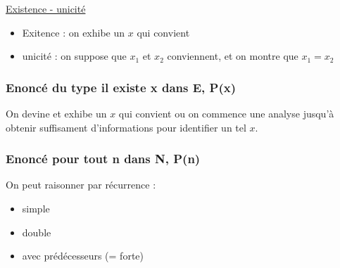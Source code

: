 \documentclass{prepacours}
\begin{document}
\underline{Existence - unicité}
\begin{itemize}
    \item Exitence : on exhibe un $x$ qui convient
    \item unicité : on suppose que $x_1$ et $x_2$ conviennent, et on montre que 
        $x_1 = x_2$
\end{itemize}

\subsubsection{Enoncé du type il existe x dans E, P(x)}

On devine et exhibe un $x$ qui convient ou on commence une analyse jusqu'à obtenir
suffisament d'informations pour identifier un tel $x$. 

\subsubsection{Enoncé pour tout n dans N, P(n)}

On peut raisonner par récurrence : 
\begin{itemize}
    \item simple
    \item double
    \item avec prédécesseurs (= forte)
\end{itemize}
\end{document}
